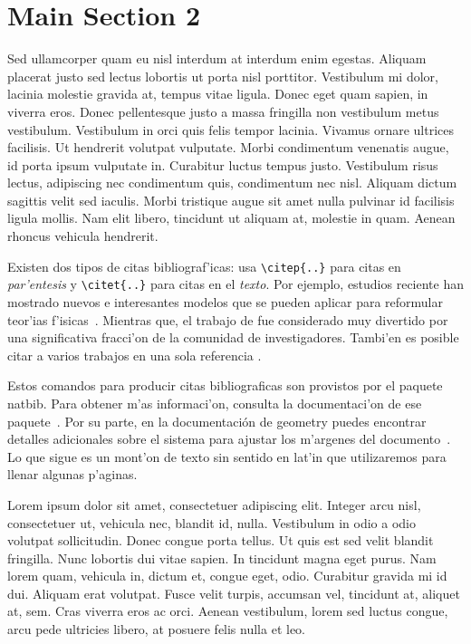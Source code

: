 \section{Main Section 2}

Sed ullamcorper quam eu nisl interdum at interdum enim egestas. Aliquam placerat justo sed lectus lobortis ut porta nisl porttitor. Vestibulum mi dolor, lacinia molestie gravida at, tempus vitae ligula. Donec eget quam sapien, in viverra eros. Donec pellentesque justo a massa fringilla non vestibulum metus vestibulum. Vestibulum in orci quis felis tempor lacinia. Vivamus ornare ultrices facilisis. Ut hendrerit volutpat vulputate. Morbi condimentum venenatis augue, id porta ipsum vulputate in. Curabitur luctus tempus justo. Vestibulum risus lectus, adipiscing nec condimentum quis, condimentum nec nisl. Aliquam dictum sagittis velit sed iaculis. Morbi tristique augue sit amet nulla pulvinar id facilisis ligula mollis. Nam elit libero, tincidunt ut aliquam at, molestie in quam. Aenean rhoncus vehicula hendrerit.




Existen dos tipos de citas bibliograf'icas: usa \verb|\citep{..}| para
citas en \emph{par'entesis} y \verb|\citet{..}| para citas
en el \emph{texto}. Por ejemplo, estudios reciente han mostrado nuevos e
interesantes modelos que se pueden aplicar para reformular teor'ias
f'isicas~\citep{NewCam97}. Mientras que, el trabajo de \citet{Rofl06} fue
considerado muy divertido por una significativa fracci'on de la comunidad
de investigadores. Tambi'en es posible citar a varios trabajos en una sola
referencia \citep{Lamport86,Knuth84}.

Estos comandos para producir citas bibliograficas son provistos por
el paquete \textsf{natbib}. Para obtener m'as informaci'on, consulta la
documentaci'on de ese paquete~\citep{doc:natbib}. Por su parte, en
la documentaci\'on de \textsf{geometry} puedes encontrar detalles
adicionales sobre el sistema para ajustar los m'argenes del
documento~\citep{doc:geometry}. Lo que sigue
es un mont'on de texto sin sentido en lat'in que utilizaremos para llenar
algunas p'aginas.

Lorem ipsum dolor sit amet, consectetuer adipiscing elit. Integer arcu nisl,
consectetuer ut, vehicula nec, blandit id, nulla. Vestibulum in odio a odio
volutpat sollicitudin. Donec congue porta tellus. Ut quis est sed velit
blandit fringilla. Nunc lobortis dui vitae sapien. In tincidunt magna eget
purus. Nam lorem quam, vehicula in, dictum et, congue eget, odio. Curabitur
gravida mi id dui. Aliquam erat volutpat. Fusce velit turpis, accumsan vel,
tincidunt at, aliquet at, sem. Cras viverra eros ac orci. Aenean vestibulum,
lorem sed luctus congue, arcu pede ultricies libero, at posuere felis nulla
et leo.

